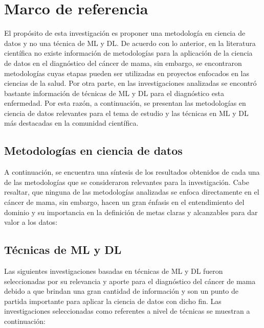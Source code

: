 \newpage
\section{Marco de referencia}
El propósito de esta investigación es proponer una metodología en ciencia de datos y no una técnica de ML y DL. De acuerdo con lo anterior, en la literatura científica no existe información de metodologías para la aplicación de la ciencia de datos en el diagnóstico del cáncer de mama, sin embargo, se encontraron metodologías cuyas etapas pueden ser utilizadas en proyectos enfocados en las ciencias de la salud. Por otra parte, en las investigaciones analizadas se encontró bastante información de técnicas de ML y DL para el diagnóstico esta enfermedad. Por esta razón, a continuación, se presentan las metodologías en ciencia de datos relevantes para el tema de estudio y las técnicas en ML y DL más destacadas en la comunidad científica.  

\subsection{Metodologías en ciencia de datos}
A continuación, se encuentra una síntesis de los resultados obtenidos de cada una de las metodologías que se consideraron relevantes para la investigación. Cabe resaltar, que ninguna de las metodologías analizadas se enfoca directamente en el cáncer de mama, sin embargo, hacen un gran énfasis en el entendimiento del dominio y su importancia en la definición de metas claras y alcanzables para dar valor a los datos:


\newpage
\subsection{Técnicas de ML y DL}
Las siguientes investigaciones basadas en técnicas de ML y DL fueron seleccionadas por su relevancia y aporte para el diagnóstico del cáncer de mama debido a que brindan una gran cantidad de información y son un punto de partida importante para aplicar la ciencia de datos con dicho fin. Las investigaciones seleccionadas como referentes a nivel de técnicas se muestran a continuación:

